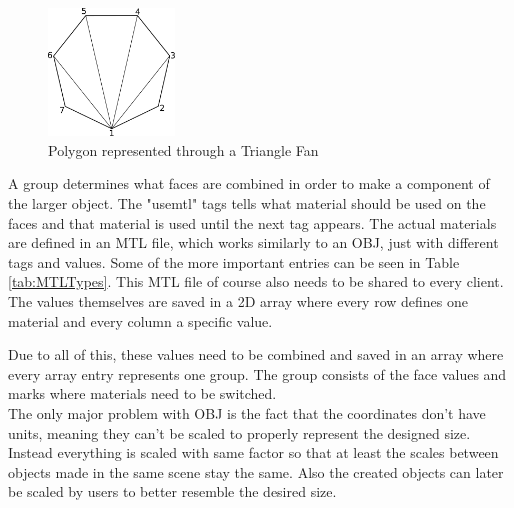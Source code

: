 \begin{figure}[htpb]
	\centering
	\includegraphics[width=0.3\textwidth]{fig/TriangleFan.pdf}
	\caption[OBJ Polygon to Triangle Fan]{Polygon represented through a Triangle Fan\protect}
	\label{fig:TriangleFan}
\end{figure}

A group determines what faces are combined in order to make a component of the larger object. The "usemtl" tags tells what material should be used on the faces and that material is used until the next tag appears. The actual materials are defined in an MTL file, which works similarly to an OBJ, just with different tags and values. Some of the more important entries can be seen in Table \ref{tab:MTLTypes}. This MTL file of course also needs to be shared to every client. The values themselves are saved in a 2D array where every row defines one material and every column a specific value. 

\begin{table}[htbp]
	\centering 
	\caption[MTL Types]{Relevant types in MTL format}
	\label{tab:MTLTypes}
\end{table}

Due to all of this, these values need to be combined and saved in an array where every array entry represents one group. The group consists of the face values and marks where materials need to be switched.\\
The only major problem with OBJ is the fact that the coordinates don't have units, meaning they can't be scaled to properly represent the designed size. Instead everything is scaled with same factor so that at least the scales between objects made in the same scene stay the same. Also the created objects can later be scaled by users to better resemble the desired size.

